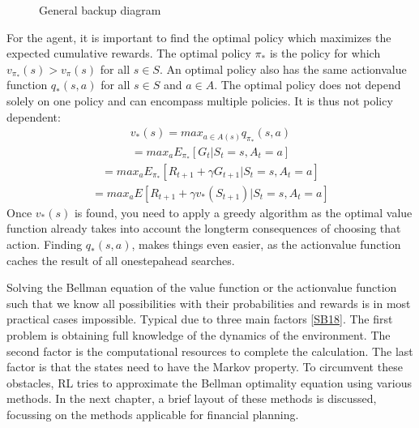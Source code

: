 \documentclass[letterpaper,10pt,english]{jupyterBook}
\let\sphinxpxdimen\pdfpxdimen\else\newdimen\sphinxpxdimen
\begin{document}
\begin{figure}[htbp]
\centering
\capstart

\noindent\sphinxincludegraphics[width=300\sphinxpxdimen,height=250\sphinxpxdimen]{{backup_diagram}.png}
\caption{General backup diagram}\label{\detokenize{Reinforcement_learning:backup-diagram-fig}}\end{figure}

\sphinxAtStartPar
For the agent, it is important to find the optimal policy which maximizes the expected cumulative rewards. The optimal policy \(\pi_*\) is the policy for which \(v_{\pi_*}(s) > v_{\pi}(s)\) for all \(s \in S\). An optimal policy also has the same action\sphinxhyphen{}value function \(q_*(s,a)\) for all \(s \in S\) and \(a \in A\). The optimal policy does not depend solely on one policy and can encompass multiple policies. It is thus not policy dependent:
\begin{equation*}
\begin{split} v_*(s) = max_{a \in A(s)} q_{\pi_*}(s,a) \end{split}
\end{equation*}\begin{equation*}
\begin{split} = max_{a} E_{\pi_*}[G_t | S_t=s, A_t=a] \end{split}
\end{equation*}\begin{equation*}
\begin{split} = max_{a} E_{\pi_*}[R_{t+1} + \gamma G_{t+1} | S_t=s, A_t=a] \end{split}
\end{equation*}\begin{equation*}
\begin{split} = max_{a} E[R_{t+1} + \gamma v_*(S_{t+1}) | S_t=s, A_t=a] \end{split}
\end{equation*}
\sphinxAtStartPar
Once \(v_*(s)\) is found, you  need to apply a greedy algorithm as the optimal value function already takes into account the long\sphinxhyphen{}term consequences of choosing that action. Finding \(q_*(s,a)\), makes things even easier, as the action\sphinxhyphen{}value function caches the result of all one\sphinxhyphen{}step\sphinxhyphen{}ahead searches.

\sphinxAtStartPar
Solving the Bellman equation of the value function or the action\sphinxhyphen{}value function such that we know all possibilities with their probabilities and rewards is in most practical cases impossible. Typical due to three main factors {[}\hyperlink{cite.Discussion:id70}{SB18}{]}. The first problem is obtaining full knowledge of the dynamics of the environment. The second factor is the computational resources to complete the calculation. The last factor is that the states need to have the Markov property. To circumvent these obstacles, RL tries to approximate the Bellman optimality equation using various methods. In the next chapter, a brief layout of these methods is discussed, focussing on the methods applicable for financial planning.
\end{document}
